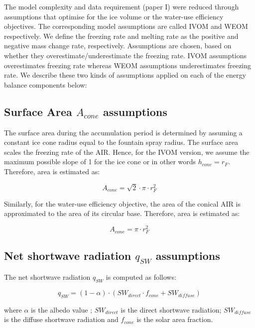 The model complexity and data requirement (paper I) were reduced through assumptions that optimise for the ice
volume or the water-use efficiency objectives. The corresponding model assumptions are called IVOM and WEOM
respectively. We define the freezing rate and melting rate as the positive and negative mass change rate,
respectively. Assumptions are chosen, based on whether they overestimate/underestimate the freezing rate. IVOM
assumptions overestimates freezing rate whereas WEOM assumptions underestimates freezing rate. We describe these
two kinds of assumptions applied on each of the energy balance components below: 

\subsection{Surface Area $A_{cone}$ assumptions}

The surface area during the accumulation period is determined by assuming a constant ice cone
radius equal to the fountain spray radius. The surface area scales the freezing rate of the AIR. Hence, for the
IVOM version, we assume the maximum possible slope of 1 for the ice cone or in other words $h_{cone} = r_{F}$.
Therefore, area is estimated as:  

\begin{equation} A_{cone} =\sqrt{2} \cdot \pi \cdot r_{F}^2  \end{equation}

Similarly, for the water-use efficiency objective, the area of the conical AIR is approximated to the area of
its circular base. Therefore, area is estimated as:

\begin{equation} A_{cone} =\pi \cdot r_{F}^2  \end{equation}

\subsection{Net shortwave radiation \texorpdfstring{$q_{SW}$}{Lg} assumptions}

The net shortwave radiation $q_{SW}$ is computed as follows:

\begin{equation} 
q_{SW} = (1- \alpha) \cdot ( SW_{direct} \cdot f_{cone} + SW_{diffuse})
\end{equation}

where $\alpha$ is the albedo value ; $SW_{direct}$ is the direct shortwave radiation; $SW_{diffuse}$ is the
diffuse shortwave radiation and $f_{cone}$ is the solar area fraction.

